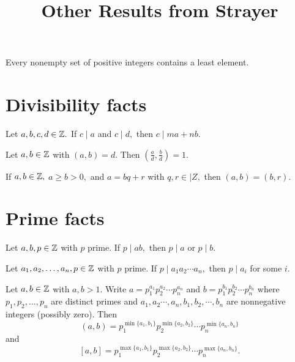 \documentclass[letterpaper, 11 pt]{ximera}
\title{Other Results from Strayer}
\begin{document}
\begin{axiom}\label{well-order}
    Every nonempty set of positive integers contains a least element.
\end{axiom}
    \section*{Divisibility facts}\label{sec:additional-div}

    \begin{lem*}[Proposition 1.2]\label{lem:linear-combo}
         Let $a,b,c,d\in\mathbb Z.$ If $c\mid a$ and $c\mid d,$ then $c\mid ma+nb.$
    \end{lem*}


    \begin{prop*}[Proposition 1.10]\label{prop:div-gcd-rel-prime}
        Let $a,b\in\mathbb Z$ with $(a,b)=d.$ Then $(\tfrac{a}{d},\tfrac{b}{d})=1.$
    \end{prop*}


    \begin{lem*}[Lemma 1.12]\label{lem:gcd-remainders}
     If $a,b\in\mathbb Z,$ $a\geq b\gt 0,$ and $a=bq+r$ with $q,r\in|Z,$ then $(a,b)=(b,r).$
    \end{lem*}
    

\section*{Prime facts}\label{sec:additional-primes}

\begin{lem*}[Lemma 1.14]\label{lem:irreducible-prime}
    Let $a,b,p\in\mathbb Z$ with $p$ prime. If $p\mid ab,$ then $p\mid a$ or $p\mid b.$
\end{lem*}

\begin{cor*}[Corollary 1.15]\label{cor:irreducible-prime} Let $a_1,a_2,\dots,a_n,p\in\mathbb Z$ with $p$ prime. If $p\mid a_1a_2\cdots a_n,$ then $p\mid a_i$ for some $i.$
\end{cor*}

\begin{prop*}[Proposition 1.17]\label{prop:form-lcm-gcd}
 Let $a,b\in\mathbb Z$ with $a,b\gt 1.$ Write $a=p_1^{a_1}p_2^{a_2}\cdots  p_n^{a_n}$ and $b=p_1^{b_1}p_2^{b_2}\cdots p_n^{b_n}$ where $p_1,p_2,\dots,p_n$ are distinct primes and ${a_1},{a_2}\cdots,{a_n},{b_1},{b_2},\cdots,{b_n}$ are nonnegative integers (possibly zero). Then
        \[(a,b)=p_1^{\min\{a_1,b_1\}}p_2^{\min\{a_2,b_2\}}\cdots p_n^{\min\{a_n,b_n\}}\]
        and 
        \[[a,b]=p_1^{\max\{a_1,b_1\}}p_2^{\max\{a_2,b_2\}}\cdots p_n^{\max\{a_n,b_n\}}.\]
\end{prop*}
\end{document}

